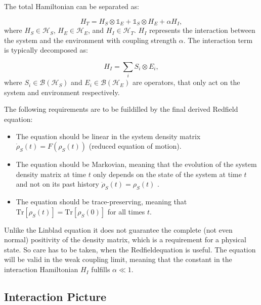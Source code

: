 The total Hamiltonian can be separated as:

\begin{equation}
	H_T = H_S \otimes \mathbb{1}_E + \mathbb{1}_S \otimes H_E + \alpha H_I,
	\label{eq:Total_Hamiltonian}
\end{equation}
where $H_S \in \mathcal{H}_S$, $H_E \in \mathcal{H}_E$, and $H_I \in \mathcal{H}_T$. $ H_I $ represents the interaction between the system and the environment with coupling strength $\alpha$.
The interaction term is typically decomposed as:

\begin{equation}
	H_I = \sum_i S_i \otimes E_i,
	\label{eq:Interaction_Hamiltonian}
\end{equation}
where $S_i \in \mathcal{B}(\mathcal{H}_S)$ and $E_i \in \mathcal{B}(\mathcal{H}_E)$ are operators, that only act on the system and environment respectively.

The following requirements are to be fuildilled by the final derived Redfield equation:

\begin{itemize}
	\item The equation should be linear in the system density matrix $ \dot{ \rho}_S(t) = F(\rho_S(t))$ (reduced equation of motion).
	\item The equation should be Markovian, meaning that the evolution of the system density matrix at time $t$ only depends on the state of the system at time $t$ and not on its past history $ \dot{ \rho}_S(t) = \rho_S(t)$ .
	\item The equation should be trace-preserving, meaning that $\mathrm{Tr}[\rho_S(t)] = \mathrm{Tr}[\rho_S(0)]$ for all times $t$.
\end{itemize}
Unlike the Linblad equation it does not guarantee the complete (not even normal) positivity of the density matrix, which is a requirement for a physical state.
So care has to be taken, when the Redfieldequation is useful.
The equation will be valid in the weak coupling limit, meaning that the constant in the interaction Hamiltonian $H_I$ fulfills  $\alpha \ll  1$.


\subsection{Interaction Picture}
\label{subsec:Interaction_Picture}

